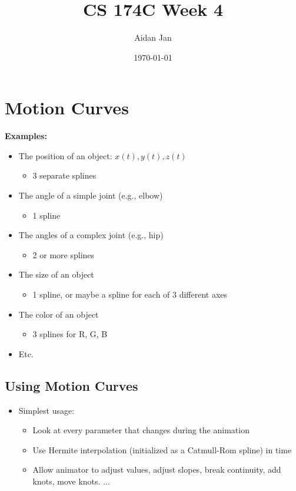 \documentclass{article}
\title{CS 174C Week 4}
\author{Aidan Jan}
\date{\today}
\begin{document}
\maketitle
\section*{Motion Curves}
\textbf{Examples:}
\begin{itemize}
    \item The position of an object: $x(t), y(t), z(t)$
    \begin{itemize}
        \item 3 separate splines
    \end{itemize}
    \item The angle of a simple joint (e.g., elbow)
    \begin{itemize}
        \item 1 spline
    \end{itemize}
    \item The angles of a complex joint (e.g., hip)
    \begin{itemize}
        \item 2 or more splines
    \end{itemize}
    \item The size of an object
    \begin{itemize}
        \item 1 spline, or maybe a spline for each of 3 different axes
    \end{itemize}
    \item The color of an object
    \begin{itemize}
        \item 3 splines for R, G, B
    \end{itemize}
    \item Etc.
\end{itemize}

\subsection*{Using Motion Curves}
\begin{itemize}
    \item Simplest usage:
    \begin{itemize}
        \item Look at every parameter that changes during the animation
        \item Use Hermite interpolation (initialized as a Catmull-Rom spline) in time
        \item Allow animator to adjust values, adjust slopes, break continuity, add knots, move knots. ...
    \end{itemize}
\end{itemize}
\end{document}
